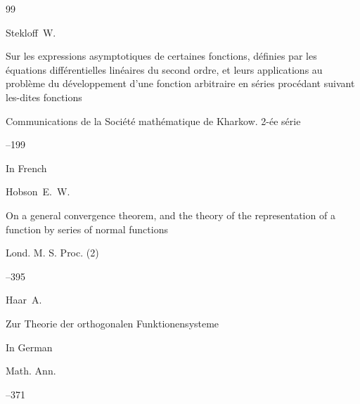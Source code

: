 \pagebreak



\begin{thebibliography}{99}




\by Stekloff~W.

\paper Sur les expressions asymptotiques de certaines fonctions, d\'efinies par les \'equations diff\'erentielles lin\'eaires du second ordre, et leurs applications au probl\`eme du d\'eveloppement d'une fonction arbitraire en s\'eries proc\'edant suivant les-dites fonctions

\jour Communications de la Soci\'et\'e math\'ematique de Kharkow. 2-\'ee s\'erie



--199


\lang In French 




\by Hobson~E.~W.

\paper On a general convergence theorem, and the theory of the representation of a function by series of normal functions

\jour Lond. M. S. Proc. \rm (2) 




--395












\by Haar~A.

\paper Zur Theorie der orthogonalen Funktionensysteme

\lang In German

\jour Math. Ann. 



--371 




\end{thebibliography}
